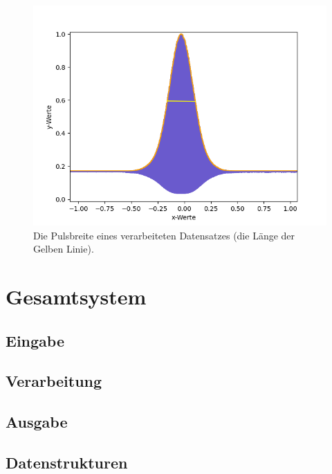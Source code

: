 \begin{figure}[htb]
    \centering
    \includegraphics[width=0.7\linewidth]{images/Pulsbreite}
    \caption{
        Die Pulsbreite eines verarbeiteten Datensatzes (die Länge der Gelben Linie).
    }
    \label{fig:pulsbreite}
\end{figure}


\section{Gesamtsystem}\label{sec:gesamtsystem}

\subsection{Eingabe}\label{subsec:eingabe}

\subsection{Verarbeitung}\label{subsec:verarbeitung}

\subsection{Ausgabe}\label{subsec:ausgabe}

\subsection{Datenstrukturen}\label{subsec:datenstrukt}
